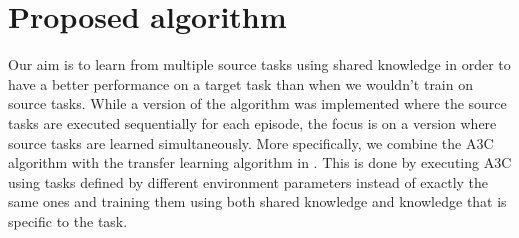 \chapter{Proposed algorithm}
\label{cha:proposed_algorithm} %
Our aim is to learn from multiple source tasks using shared knowledge in order to have a better performance on a target task than when we wouldn't train on source tasks.
While a version of the algorithm was implemented where the source tasks are executed sequentially for each episode, the focus is on a version where source tasks are learned simultaneously.
More specifically, we combine the A3C algorithm \parencite{Mnih2016AsynchronousLearning} with the transfer learning algorithm in \cite{Isele2016UsingLearning}.
This is done by executing A3C using tasks defined by different environment parameters instead of exactly the same ones and training them using both shared knowledge and knowledge that is specific to the task.\\

